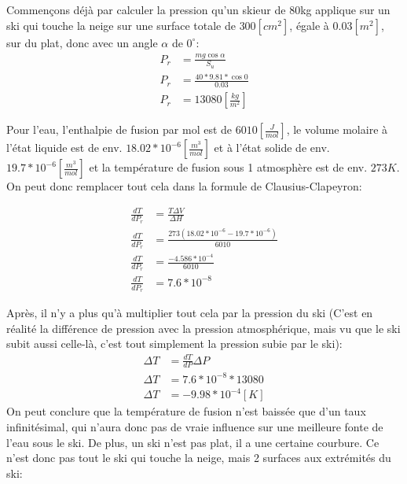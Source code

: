 \documentclass{article}
\begin{document}
\vspace{0.4cm}

Commençons déjà par calculer la pression qu'un skieur de 80kg applique sur un ski qui touche la neige sur une surface totale de $300[cm^2]$, égale à $0.03[m^2]$, sur du plat, donc avec un angle $\alpha$ de $0^\circ$:
\vspace{0.1cm}
\begin{align}
    \nonumber
    P_r &= \frac{mg\cos{\alpha}}{S_u} \\
    \nonumber
    P_r &= \frac{40*9.81*\cos{0}}{0.03} \\ %
    \nonumber
    P_r &= 13080 [\frac{kg}{m^2}]    
\end{align}

Pour l'eau, l'enthalpie de fusion par mol est de $6010[\frac{J}{mol}]$, le volume molaire à l'état liquide est de env. $18.02*10^{-6}[\frac{m^3}{mol}]$ et à l'état solide de env. $19.7*10^{-6}[\frac{m^3}{mol}]$ et la température de fusion sous 1 atmosphère est de env. $273K$. On peut donc remplacer tout cela dans la formule de Clausius-Clapeyron:

\begin{align}
    \nonumber
    \frac{dT}{dP_r} &= \frac{T\Delta{V}}{\Delta{H}} \\
    \nonumber
    \frac{dT}{dP_r} &= \frac{273(18.02*10^{-6}-19.7*10^{-6})}{6010} \\
    \nonumber
    \frac{dT}{dP_r} &= \frac{-4.586*10^{-4}}{6010} \\
    \nonumber
    \frac{dT}{dP_r} &= 7.6*10^{-8}
\end{align}

Après, il n'y a plus qu'à multiplier tout cela par la pression du ski (C'est en réalité la différence de pression avec la pression atmosphérique, mais vu que le ski subit aussi celle-là, c'est tout simplement la pression subie par le ski):
\begin{align}
    \nonumber
    \Delta{T} &= \frac{dT}{dP}\Delta P \\
    \nonumber
    \Delta{T} &= 7.6*10^{-8}*13080 \\
    \nonumber
    \Delta{T} &= -9.98*10^{-4}[K]
\end{align}
On peut conclure que la température de fusion n'est baissée que d'un taux infinitésimal, qui n'aura donc pas de vraie influence sur une meilleure fonte de l'eau sous le ski. 
\newline De plus, un ski n'est pas plat, il a une certaine courbure. Ce n'est donc pas tout le ski qui touche la neige, mais 2 surfaces aux extrémités du ski: 
\end{document}
